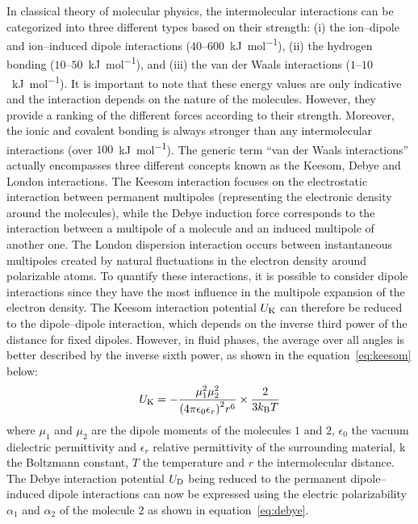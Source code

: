 \documentclass[main.tex]{subfiles}
\begin{document}
In classical theory of molecular physics, the intermolecular interactions can be categorized into three different types based on their strength: (i) the ion--dipole and ion--induced dipole interactions ($40$--$600$~\si{\kilo\joule\per\mol}), (ii) the hydrogen bonding ($10$--$50$~\si{\kilo\joule\per\mol}), and (iii) the van der Waals interactions ($1$--$10$~\si{\kilo\joule\per\mol}). It is important to note that these energy values are only indicative and the interaction depends on the nature of the molecules. However, they provide a ranking of the different forces according to their strength. Moreover, the ionic and covalent bonding is always stronger than any intermolecular interactions (over $100$~\si{\kilo\joule\per\mol}). The generic term ``van der Waals interactions'' actually encompasses three different concepts known as the Keesom, Debye and London interactions. The Keesom interaction focuses on the electrostatic interaction between permanent multipoles (representing the electronic density around the molecules),\autocite{keesom1915second} while the Debye induction force corresponds to the interaction between a multipole of a molecule and an induced multipole of another one.\autocite{Roberts_1938} The London dispersion interaction occurs between instantaneous multipoles created by natural fluctuations in the electron density around polarizable atoms.\autocite{london1930theorie,polanyi1932section} To quantify these interactions, it is possible to consider dipole interactions since they have the most influence in the multipole expansion of the electron density. The Keesom interaction potential $U_{\text{K}}$ can therefore be reduced to the dipole--dipole interaction, which depends on the inverse third power of the distance for fixed dipoles. However, in fluid phases, the average over all angles is better described by the inverse sixth power, as shown in the equation~\ref{eq:keesom} below:
\begin{equation}\label{eq:keesom}
  U_{\text{K}} = -\dfrac{\mu_1^2\mu_2^2}{{(4\pi\epsilon_0\epsilon_r)}^2r^6}\times\dfrac{2}{ 3k_{\text{B}}T}
\end{equation}
where $\mu_1$ and $\mu_2$ are the dipole moments of the molecules $1$ and $2$, $\epsilon_0$ the vacuum dielectric permittivity and $\epsilon_r$ relative permittivity of the surrounding material, k the Boltzmann constant, $T$ the temperature and $r$ the intermolecular distance. The Debye interaction potential $U_{\text{D}}$ being reduced to the permanent dipole--induced dipole interactions can now be expressed using the electric polarizability $\alpha_1$ and $\alpha_2$ of the molecule $2$ as shown in equation~\ref{eq:debye}.
\end{document}
